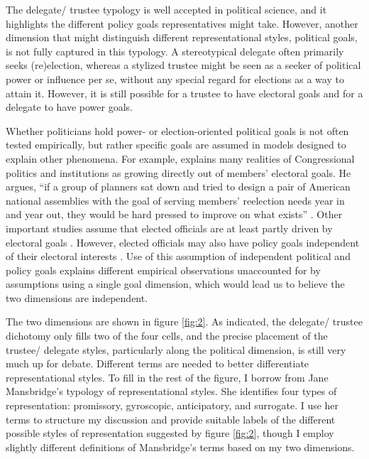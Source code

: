 The delegate/ trustee typology is well accepted in political science, and it highlights the different policy goals representatives might take. However, another dimension that might distinguish different representational styles, political goals, is not fully captured in this typology. A stereotypical delegate often primarily seeks (re)election, whereas a stylized trustee might be seen as a seeker of political power or influence per se, without any special regard for elections as a way to attain it. However, it is still possible for a trustee to have electoral goals and for a delegate to have power goals.

Whether politicians hold power- or election-oriented political goals is not often tested empirically, but rather specific goals are assumed in models designed to explain other phenomena. For example, \citet{Mayhew1974} explains many realities of Congressional politics and institutions as growing directly out of members' electoral goals. He argues, ``if a group of planners sat down and tried to design a pair of American national assemblies with the goal of serving members' reelection needs year in and year out, they would be hard pressed to improve on what exists'' \citep[][, 81-82]{Mayhew1974}. Other important studies assume that elected officials are at least partly driven by electoral goals \citep{Fenno1973,Fenno1977,Downs1957}. However, elected officials may also have policy goals independent of their electoral interests \citep{Fenno1973}. Use of this assumption of independent political and policy goals explains different empirical observations unaccounted for by assumptions using a single goal dimension, which would lead us to believe the two dimensions are independent.

The two dimensions are shown in figure \ref{fig:2}. As indicated, the delegate/ trustee dichotomy only fills two of the four cells, and the precise placement of the trustee/ delegate styles, particularly along the political dimension, is still very much up for debate. Different terms are needed to better differentiate representational styles. To fill in the rest of the figure, I borrow from Jane Mansbridge's \citeyearpar{Mansbridge2003} typology of representational styles. She identifies four types of representation: promissory, gyroscopic, anticipatory, and surrogate. I use her terms to structure my discussion and provide suitable labels of the different possible styles of representation suggested by figure \ref{fig:2}, though I employ slightly different definitions of Mansbridge's terms based on my two dimensions.

